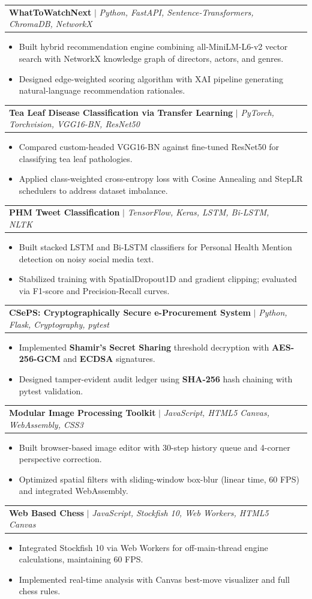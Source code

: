 \documentclass[letterpaper,11pt]{article}
\makeatletter
\newcommand{\resumeItem}[1]{
  \item\normalsize{
    {#1 \vspace{-2pt}}
  }
}
\newcommand{\resumeProjectHeading}[2]{
    \item
    \begin{tabular*}{0.97\textwidth}{l@{\extracolsep{\fill}}r}
      \small#1 & #2 \\
    \end{tabular*}\vspace{-7pt}
}
\newcommand{\resumeItemListStart}{\begin{itemize}}
\newcommand{\resumeItemListEnd}{\end{itemize}\vspace{-5pt}}
\makeatother
\begin{document}
      \resumeProjectHeading
          {\textbf{WhatToWatchNext} $|$ \emph{Python, FastAPI, Sentence-Transformers, ChromaDB, NetworkX}}{}
          \resumeItemListStart
            \resumeItem{Built hybrid recommendation engine combining all-MiniLM-L6-v2 vector search with NetworkX knowledge graph of directors, actors, and genres.}
            \resumeItem{Designed edge-weighted scoring algorithm with XAI pipeline generating natural-language recommendation rationales.}
          \resumeItemListEnd

      \resumeProjectHeading
          {\textbf{Tea Leaf Disease Classification via Transfer Learning} $|$ \emph{PyTorch, Torchvision, VGG16-BN, ResNet50}}{}
          \resumeItemListStart
            \resumeItem{Compared custom-headed VGG16-BN against fine-tuned ResNet50 for classifying tea leaf pathologies.}
            \resumeItem{Applied class-weighted cross-entropy loss with Cosine Annealing and StepLR schedulers to address dataset imbalance.}
          \resumeItemListEnd

      \resumeProjectHeading
          {\textbf{PHM Tweet Classification} $|$ \emph{TensorFlow, Keras, LSTM, Bi-LSTM, NLTK}}{}
          \resumeItemListStart
            \resumeItem{Built stacked LSTM and Bi-LSTM classifiers for Personal Health Mention detection on noisy social media text.}
            \resumeItem{Stabilized training with SpatialDropout1D and gradient clipping; evaluated via F1-score and Precision-Recall curves.}
          \resumeItemListEnd

      \resumeProjectHeading
          {\textbf{CSePS: Cryptographically Secure e-Procurement System} $|$ \emph{Python, Flask, Cryptography, pytest}}{}
          \resumeItemListStart
            \resumeItem{Implemented \textbf{Shamir's Secret Sharing} threshold decryption with \textbf{AES-256-GCM} and \textbf{ECDSA} signatures.}
            \resumeItem{Designed tamper-evident audit ledger using \textbf{SHA-256} hash chaining with pytest validation.}
          \resumeItemListEnd

      \resumeProjectHeading
          {\textbf{Modular Image Processing Toolkit} $|$ \emph{JavaScript, HTML5 Canvas, WebAssembly, CSS3}}{}
          \resumeItemListStart
            \resumeItem{Built browser-based image editor with 30-step history queue and 4-corner perspective correction.}
            \resumeItem{Optimized spatial filters with sliding-window box-blur (linear time, 60 FPS) and integrated WebAssembly.}
          \resumeItemListEnd

      \resumeProjectHeading
          {\textbf{Web Based Chess} $|$ \emph{JavaScript, Stockfish 10, Web Workers, HTML5 Canvas}}{}
          \resumeItemListStart
            \resumeItem{Integrated Stockfish 10 via Web Workers for off-main-thread engine calculations, maintaining 60 FPS.}
            \resumeItem{Implemented real-time analysis with Canvas best-move visualizer and full chess rules.}
          \resumeItemListEnd
\end{document}
